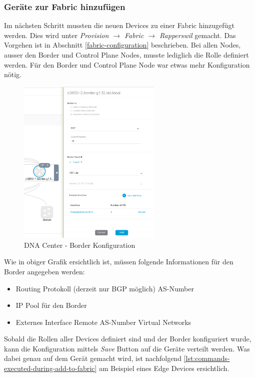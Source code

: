 \subsubsection{Geräte zur Fabric hinzufügen}
Im nächsten Schritt mussten die neuen Devices zu einer Fabric hinzugefügt werden. Dies wird unter \textit{Provision $\rightarrow$ Fabric $\rightarrow$ Rapperswil} gemacht. Das Vorgehen ist in Abschnitt \ref{fabric-configuration} beschrieben. Bei allen Nodes, ausser den Border und Control Plane Nodes, musste lediglich die Rolle definiert werden. Für den Border und Control Plane Node war etwas mehr Konfiguration nötig. 

\begin{figure}[H]
	\centering
	\includegraphics[height=8cm]{img/secondtry/dna-border-configuration.png}
	\caption{DNA Center - Border Konfiguration}
	\label{fig:dna-center-border-configuration}
\end{figure}

Wie in obiger Grafik ersichtlich ist, müssen folgende Informationen für den Border angegeben werden:
\begin{itemize}
	\item Routing Protokoll (derzeit nur BGP möglich)
	\subitem AS-Number
	\item IP Pool für den Border
	\item Externes Interface
	\subitem Remote AS-Number
	\subitem Virtual Networks
\end{itemize}

Sobald die Rollen aller Devices definiert sind und der Border konfiguriert wurde, kann die Konfiguration mittels \textit{Save} Button auf die Geräte verteilt werden.
Was dabei genau auf dem Gerät gemacht wird, ist nachfolgend \ref{lst:commands-executed-during-add-to-fabric} am Beispiel eines Edge Devices ersichtlich.

